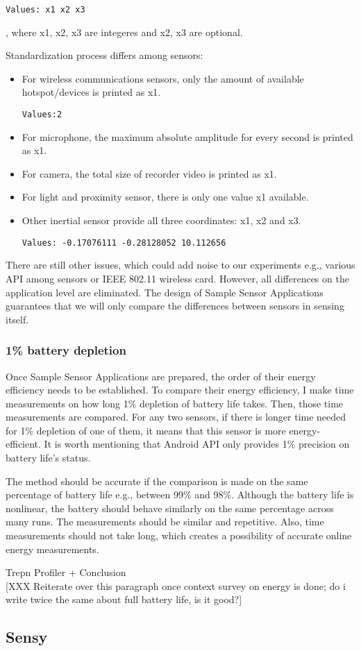 \begin{lstlisting}[frame=single]
Values: x1 x2 x3
\end{lstlisting}, where x1, x2, x3 are integeres and x2, x3 are optional. 

Standardization process differs among sensors:
\begin{itemize}
	\item For wireless communications sensors, only the amount of available hotspot/devices is printed as x1. 
		\begin{lstlisting}[frame=single]
Values:2
		\end{lstlisting}
	\item For microphone, the maximum absolute amplitude for every second is printed as x1.
	\item For camera, the total size of recorder video is printed as x1.
	\item For light and proximity sensor, there is only one value x1 available.
	\item Other inertial sensor provide all three coordinates: x1, x2 and x3.
		\begin{lstlisting}[frame=single]
Values: -0.17076111 -0.28128052 10.112656
		\end{lstlisting}
\end{itemize}

There are still other issues, which could add noise to our experiments e.g., various API among sensors or IEEE 802.11 wireless card. However, all differences on the application level are eliminated. The design of Sample Sensor Applications guarantees that we will only compare the differences between sensors in sensing itself.
				
\subsubsection{1\% battery depletion}	
\label{s:design:measurements:method}
\hspace{10pt} Once  Sample Sensor Applications are prepared, the order of their energy efficiency needs to be established. To compare their energy efficiency, I make time measurements on how long 1\% depletion of battery life takes. Then, those time measurements are compared. For any two sensors, if there is longer time needed for 1\% depletion of one of them, it means that this sensor is more energy-efficient. It is worth mentioning that Android API only provides 1\% precision on battery life's status. 

The method should be accurate if the comparison is made on the same percentage of battery life e.g., between 99\% and 98\%. Although the battery life is nonlinear, the battery should behave similarly on the same percentage across many runs. The measurements should be similar and repetitive. Also, time measurements should not take long, which creates a possibility of accurate online energy measurements. 

Trepn Profiler + Conclusion\\

[XXX Reiterate over this paragraph once context survey on energy is done;
	do i write twice the same about full battery life, is it good?]			
			
		
		
		
\subsection{Sensy}
\label{s:design:sensy}
